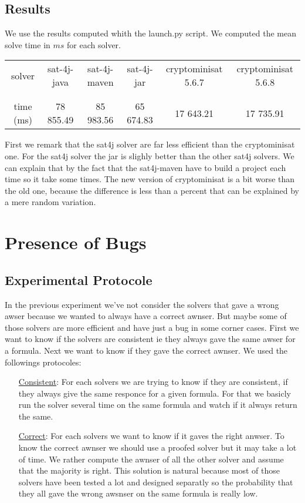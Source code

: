 \documentclass{article}
\begin{document}
\subsection{Results}
We use the results computed whith the launch.py script. We computed the mean solve time in $ms$ for each solver.

\vskip 3mm

\begin{tabular}{|c|c|c|c|c|c|}
\hline
  solver & sat-4j-java & sat-4j-maven & sat-4j-jar & cryptominisat 5.6.7 & cryptominisat 5.6.8 \\
 & & & & & \\   \hline  & & & & & \\ 
  time (ms) & 78 855.49 & 85 983.56 & 65 674.83 &  17 643.21 & 17 735.91 \\
  \hline
\end{tabular}

\vskip 3mm

First we remark that the sat4j solver are far less efficient than the cryptominisat one. For the sat4j solver the jar is slighly better than the other sat4j solvers. We can explain that by the fact that the sat4j-maven have to build a project each time so it take some times. The new version of cryptominisat is a bit worse than the old one, because the difference is less than a percent that can be explained by a mere random variation. 

\section{Presence of Bugs}
\subsection{Experimental Protocole}
In the previous experiment we've not consider the solvers that gave a wrong awser because we wanted to always have a correct awnser. But maybe some of those solvers are more efficient and have just a bug in some corner cases. First we want to know if the solvers are consistent ie they always gave the same awser for a formula. Next we want to know if they gave the correct awnser.  
We used the followings protocoles:

\vskip 3mm

\begin{itemize}
\item[\underline{Consistent}:]  For each solvers we are trying to know if they are consistent, if they always give the same responce for a given formula. For that we basicly run the solver several time on the same formula and watch if it always return the same. 
\item[\underline{Correct}:] For each solvers we want to know if it gaves the right anwser. To know the correct awnser we should use a proofed solver but it may take a lot of time. We rather compute the awnser of all the other solver and assume that the majority is right. This solution is natural because most of those solvers have been tested a lot and designed separatly so the probability that they all gave the wrong awsnser on the same formula is really low. 
\end{itemize}
\end{document}
